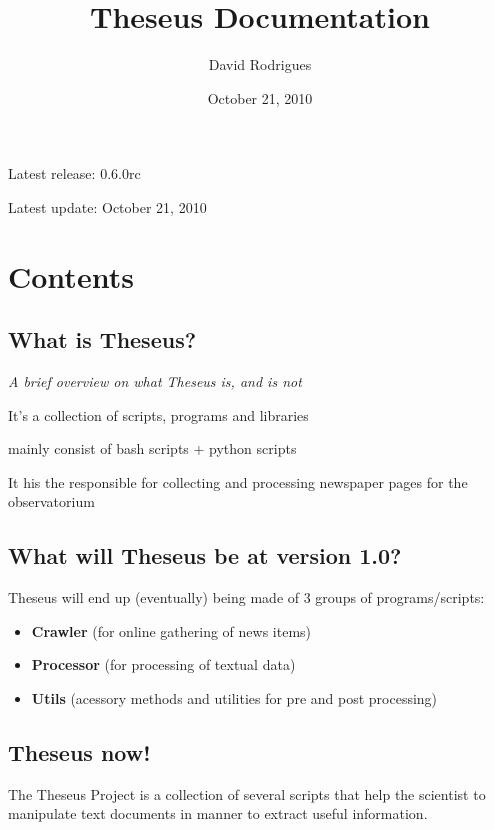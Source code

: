 \documentclass[letterpaper,10pt,english]{sphinxmanual}
\title{Theseus Documentation}
\date{October 21, 2010}
\author{David Rodrigues}
\begin{document}
\maketitle
\tableofcontents
{}\label{index::doc}


Latest release: 0.6.0rc

Latest update: October 21, 2010


\chapter{Contents}
\label{index:contents}\label{index:theseus-s-documentation}

\section{What is Theseus?}
\label{whatis:what-is-theseus}\label{whatis::doc}
\emph{A brief overview on what Theseus is, and is not}

It's a collection of scripts, programs and libraries

mainly consist of bash scripts + python scripts

It his the responsible for collecting and processing newspaper pages for the observatorium


\section{What will Theseus be at version 1.0?}
\label{whatis:what-will-theseus-be-at-version-1-0}
Theseus will end up (eventually) being made of 3 groups of programs/scripts:
\begin{itemize}
\item {} 
\textbf{Crawler} (for online gathering of news items)

\item {} 
\textbf{Processor} (for processing of textual data)

\item {} 
\textbf{Utils} (acessory methods and utilities for pre and post processing)

\end{itemize}


\section{Theseus now!}
\label{theseus:theseus-now}\label{theseus::doc}
The Theseus Project is a collection of several scripts that help the scientist to manipulate text documents in manner to extract useful information.
\end{document}

